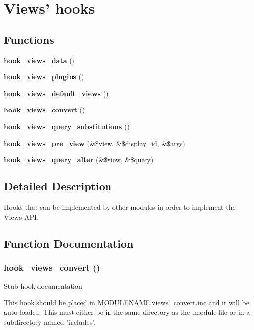 \section{Views' hooks}
\label{group__views__hooks}
\subsection*{Functions}
\begin{CompactItemize}
\item 
{\bf hook\_\-views\_\-data} ()
\item 
{\bf hook\_\-views\_\-plugins} ()
\item 
{\bf hook\_\-views\_\-default\_\-views} ()
\item 
{\bf hook\_\-views\_\-convert} ()
\item 
{\bf hook\_\-views\_\-query\_\-substitutions} ()
\item 
{\bf hook\_\-views\_\-pre\_\-view} (\&\$view, \&\$display\_\-id, \&\$args)
\item 
{\bf hook\_\-views\_\-query\_\-alter} (\&\$view, \&\$query)
\end{CompactItemize}


\subsection{Detailed Description}
Hooks that can be implemented by other modules in order to implement the Views API. 

\subsection{Function Documentation}
\subsubsection{\setlength{\rightskip}{0pt plus 5cm}hook\_\-views\_\-convert ()}\label{group__views__hooks_ge98b0a1c700fe1406af390dfc8c7262e}


Stub hook documentation

This hook should be placed in MODULENAME.views\_\-convert.inc and it will be auto-loaded. This must either be in the same directory as the .module file or in a subdirectory named 'includes'. 
